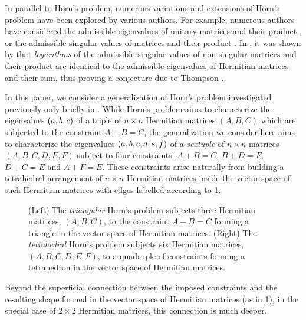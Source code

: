 \documentclass[notitlepage, 10pt]{article}
\begin{document}
In parallel to Horn's problem, numerous variations and extensions of Horn's problem have been explored by various authors.
For example, numerous authors have considered the admissible eigenvalues of unitary matrices and their product \cite{agnihotri1997eigenvalues,belkale2008quantum,belkale2016multiplicative}, or the admissible singular values of matrices and their product \cite{speyer2005horn,thompson1971eigenvaluesviii}.
In \citeyear{klyachko2000random}, it was shown by \cite{klyachko2000random} that \textit{logarithms} of the admissible singular values of non-singular matrices and their product are identical to the admissible eigenvalues of Hermitian matrices and their sum, thus proving a conjecture due to Thompson \cite{klyachko2000random, alekseev2001linearization}.

In this paper, we consider a generalization of Horn's problem investigated previously only briefly in \cite{christandl2018recoupling}.
While Horn's problem aims to characterize the eigenvalues $(a, b, c)$ of a triple of $n\times n$ Hermitian matrices $(A,B,C)$ which are subjected to the constraint $A+B=C$, the generalization we consider here aims to characterize the eigenvalues $(a,b,c,d,e,f)$ of a \textit{sextuple} of $n\times n$ matrices $(A,B,C,D,E,F)$ subject to four constraints: $A+B=C$, $B+D=F$, $D+C=E$ and $A+F=E$.
These constraints arise naturally from building a tetrahedral arrangement of $n\times n$ Hermitian matrices inside the vector space of such Hermitian matrices with edges labelled according to \cref{fig:tetrahedron_labelling_scheme}.
\begin{center}%
    \begin{figure}%
        \caption{(Left) The \textit{triangular} Horn's problem subjects three Hermitian matrices, $(A,B,C)$, to the constraint $A+B=C$ forming a triangle in the vector space of Hermitian matrices. (Right) The \textit{tetrahedral} Horn's problem subjects six Hermitian matrices, $(A,B,C,D,E,F)$, to a quadruple of constraints forming a tetrahedron in the vector space of Hermitian matrices.}%
        \label{fig:tetrahedron_labelling_scheme}%
    \end{figure}%
\end{center}%
Beyond the superficial connection between the imposed constraints and the resulting shape formed in the vector space of Hermitian matrices (as in \cref{fig:tetrahedron_labelling_scheme}), in the special case of $2\times 2$ Hermitian matrices, this connection is much deeper.
\end{document}
